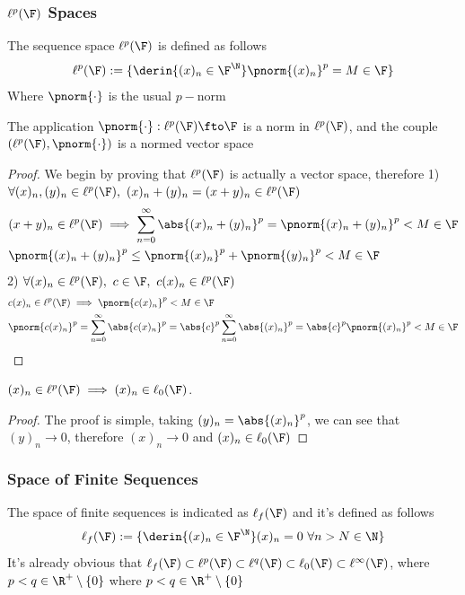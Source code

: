 \documentclass[../mmf.tex]{subfiles}
\begin{document}
\subsubsection{$\ell^p(\F)$ Spaces}
\begin{dfn}
	The sequence space $\ell^p(\F)$ is defined as follows
	\begin{equation}
		\ell^p(\F):=\{\derin{(x)_n\in\F^\N}\pnorm{(x)_n}^p=M\in\F\}
		\label{eq:ellpspace}
	\end{equation}
	Where $\pnorm{\cdot}$ is the usual $p-$norm
\end{dfn}
\begin{prop}
	The application $\pnorm{\cdot}:\ell^p(\F)\fto\F$ is a norm in $\ell^p(\F)$, and the couple $(\ell^p(\F),\pnorm{\cdot})$ is a normed vector space
\end{prop}
\begin{proof}
	We begin by proving that $\ell^p(\F)$ is actually a vector space, therefore
	1) $\forall(x)_n,(y)_n\in\ell^p(\F),\ (x)_n+(y)_n=(x+y)_n\in\ell^p(\F)$
	\begin{equation*}
		\begin{aligned}
			&(x+y)_n\in\ell^p(\F)\implies\sum_{n=0}^\infty\abs{(x)_n+(y)_n}^p=\pnorm{(x)_n+(y)_n}^p<M\in\F\\
			&\pnorm{(x)_n+(y)_n}^p\le\pnorm{(x)_n}^p+\pnorm{(y)_n}^p<M\in\F
		\end{aligned}
	\end{equation*}
	2) $\forall(x)_n\in\ell^p(\F),\ c\in\F,\ c(x)_n\in\ell^p(\F)$
	\begin{equation*}
		\begin{aligned}
			&c(x)_n\in\ell^p(\F)\implies\pnorm{c(x)_n}^p<M\in\F\\
			&\pnorm{c(x)_n}^p=\sum_{n=0}^\infty\abs{c(x)_n}^p=\abs{c}^p\sum_{n=0}^\infty\abs{(x)_n}^p=\abs{c}^p\pnorm{(x)_n}^p<M\in\F
		\end{aligned}
	\end{equation*}
\end{proof}
\begin{rmk}
	$(x)_n\in\ell^p(\F)\implies(x)_n\in\ell_0(\F)$.
\end{rmk}
\begin{proof}
	The proof is simple, taking $(y)_n=\abs{(x)_n}^p$, we can see that $(y)_n\to0$, therefore $(x)_n\to0$ and $(x)_n\in\ell_0(\F)$
\end{proof}
\subsubsection{Space of Finite Sequences}
\begin{dfn}
	The space of finite sequences is indicated as $\ell_f(\F)$ and it's defined as follows
	\begin{equation}
		\ell_f(\F):=\{\derin{(x)_n\in\F^\N}(x)_n=0\ \forall n>N\in\N\}
		\label{eq:ellf}
	\end{equation}
	It's already obvious that $\ell_f(\F)\subset\ell^p(\F)\subset\ell^q(\F)\subset\ell_0(\F)\subset\ell^\infty(\F)$, where $p<q\in\R^+\setminus\{0\}$ where $p<q\in\R^+\setminus\{0\}$
\end{dfn}
\end{document}
